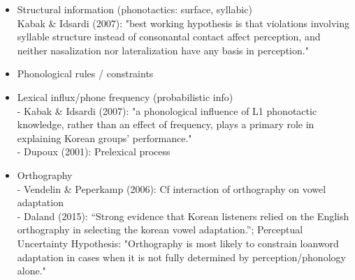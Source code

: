 {\begin{itemize}
\item Structural information (phonotactics: surface, syllabic) \\
  Kabak \& Idsardi (2007): "best working hypothesis is that violations involving syllable structure instead of consonantal contact affect perception, and neither nasalization nor lateralization have any basis in perception."
  \item Phonological rules / constraints
  \item Lexical influx/phone frequency (probabilistic info) \\
    - Kabak \& Idsardi (2007): "a phonological influence of L1 phonotactic knowledge, rather than an effect of frequency, plays a primary role in explaining Korean groups’ performance." \\
    - Dupoux (2001): Prelexical process 

  \item Orthography \\
    - Vendelin \& Peperkamp (2006): Cf interaction of orthography on vowel adaptation \\ 
    - Daland (2015): ``Strong evidence that Korean listeners relied on the English orthography in selecting the korean vowel adaptation.''; Perceptual Uncertainty Hypothesis: "Orthography is most likely to constrain loanword adaptation in cases when it is not fully determined by perception/phonology alone."
    
\end{itemize}

}
